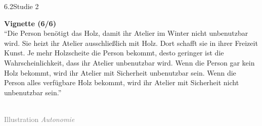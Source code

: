 \documentclass[xcolor=table,9pt,aspectratio=169]{beamer}
\begin{document}
\begin{frame}{\vspace*{10mm}6.2\hspace*{1em}Studie 2}
\begin{multicols}{2}
   \textbf{Vignette (6/6)}\\
   \medskip
   \enquote{Die Person benötigt das Holz, damit ihr Atelier im Winter nicht unbenutzbar wird. Sie heizt ihr Atelier ausschließlich mit Holz. Dort schafft sie in ihrer Freizeit Kunst. Je mehr Holzscheite die Person bekommt, desto geringer ist die Wahrscheinlichkeit, dass ihr Atelier unbenutzbar wird. Wenn die Person gar kein Holz bekommt, wird ihr Atelier mit Sicherheit unbenutzbar sein. Wenn die Person alles verfügbare Holz bekommt, wird ihr Atelier mit Sicherheit nicht unbenutzbar sein.}\\
   \vfill
   \begin{center}
      \\
      \textcolor{gray}{Illustration \textit{Autonomie}}
   \end{center}
\end{multicols}
\end{frame}
\end{document}
